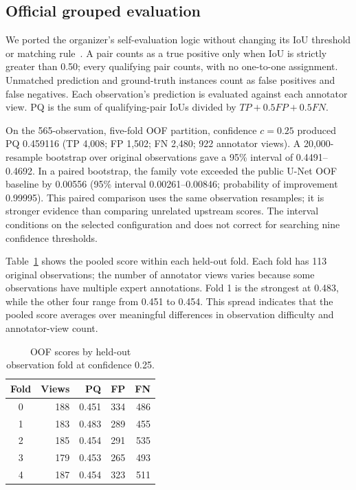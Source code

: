 \documentclass[sigconf]{acmart}
\begin{document}
    \subsection{Official grouped evaluation}
We ported the organizer's self-evaluation logic without changing its IoU threshold or matching rule~\cite{officialscorer2026}. A pair counts as a true positive only when IoU is strictly greater than 0.50; every qualifying pair counts, with no one-to-one assignment. Unmatched prediction and ground-truth instances count as false positives and false negatives. Each observation's prediction is evaluated against each annotator view. PQ is the sum of qualifying-pair IoUs divided by $TP+0.5FP+0.5FN$.

On the 565-observation, five-fold OOF partition, confidence $c=0.25$ produced PQ 0.459116 (TP 4,008; FP 1,502; FN 2,480; 922 annotator views). A 20,000-resample bootstrap over original observations gave a 95\% interval of 0.4491--0.4692. In a paired bootstrap, the family vote exceeded the public U-Net OOF baseline by 0.00556 (95\% interval 0.00261--0.00846; probability of improvement 0.99995). This paired comparison uses the same observation resamples; it is stronger evidence than comparing unrelated upstream scores. The interval conditions on the selected configuration and does not correct for searching nine confidence thresholds.

Table~\ref{tab:folds} shows the pooled score within each held-out fold. Each fold has 113 original observations; the number of annotator views varies because some observations have multiple expert annotations. Fold 1 is the strongest at 0.483, while the other four range from 0.451 to 0.454. This spread indicates that the pooled score averages over meaningful differences in observation difficulty and annotator-view count.

\begin{table}[t]
\centering
\caption{OOF scores by held-out observation fold at confidence 0.25.}
\label{tab:folds}
\small
\begin{tabular}{crrrr}
\toprule
Fold & Views & PQ & FP & FN \\
\midrule
0 & 188 & 0.451 & 334 & 486 \\
1 & 183 & 0.483 & 289 & 455 \\
2 & 185 & 0.454 & 291 & 535 \\
3 & 179 & 0.453 & 265 & 493 \\
4 & 187 & 0.454 & 323 & 511 \\
\bottomrule
\end{tabular}
\end{table}
\end{document}

